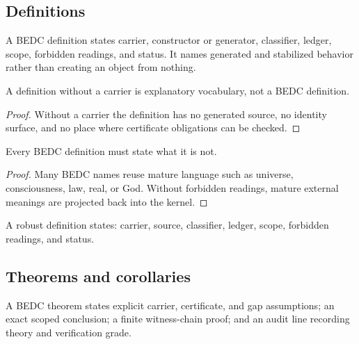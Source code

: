 \subsection{Definitions}
\label{subsec:philosophy-definition-discipline}

\begin{definition}
\label{def:philosophy-bedc-definition-discipline}
A BEDC definition states carrier, constructor or generator, classifier,
ledger, scope, forbidden readings, and status. It names generated and
stabilized behavior rather than creating an object from nothing.
\end{definition}

\begin{theorem}
\label{thm:philosophy-definitions-require-carriers}
A definition without a carrier is explanatory vocabulary, not a BEDC
definition.
\end{theorem}
\begin{proof}
Without a carrier the definition has no generated source, no identity
surface, and no place where certificate obligations can be checked.
\end{proof}

\begin{theorem}
\label{thm:philosophy-definitions-require-forbidden-readings}
Every BEDC definition must state what it is not.
\end{theorem}
\begin{proof}
Many BEDC names reuse mature language such as universe, consciousness,
law, real, or God. Without forbidden readings, mature external meanings
are projected back into the kernel.
\end{proof}

\begin{corollary}
\label{cor:philosophy-definition-template}
A robust definition states: carrier, source, classifier, ledger, scope,
forbidden readings, and status.
\end{corollary}

\subsection{Theorems and corollaries}
\label{subsec:philosophy-theorem-corollary-discipline}

\begin{definition}
\label{def:philosophy-bedc-theorem-discipline}
A BEDC theorem states explicit carrier, certificate, and gap
assumptions; an exact scoped conclusion; a finite witness-chain proof;
and an audit line recording theory and verification grade.
\end{definition}

